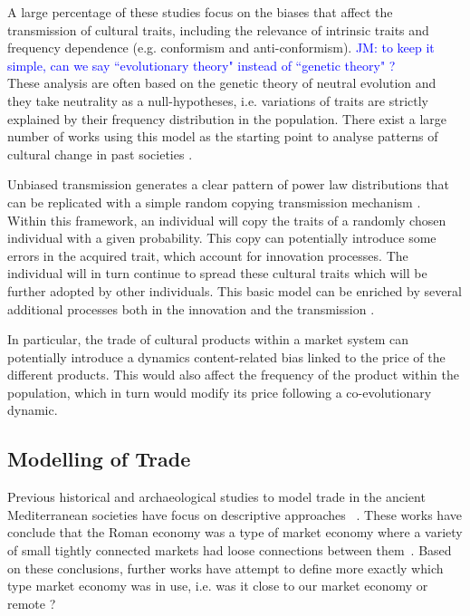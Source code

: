 \documentclass{wscpaperproc}
\newcommand{\memo}[2]{\textcolor{#1}{#2}}
\newcommand{\jm}[1]{\memo{blue}{JM: #1\\}}
\begin{document}
A large percentage of these studies focus on the biases that affect the transmission of cultural traits, including the relevance of intrinsic traits and frequency dependence (e.g. conformism and anti-conformism). 
\jm{to keep it simple, can we say ``evolutionary theory" instead of ``genetic theory" ?}
These analysis are often based on the genetic theory of neutral evolution \cite{neiman_stylistic_1995} and they take neutrality as a null-hypotheses, i.e. variations of traits are strictly explained by their frequency distribution in the population. There exist a large number of works using this model as the starting point to analyse patterns of cultural change in past societies \cite{lipo_neutralitystyle_2001,shennan_ceramic_2001,steele_ceramic_2010,kandler_nonequilibrium_2013,porcic_exploring_2014,crema_approximate_2014}.

Unbiased transmission generates a clear pattern of power law distributions that can be replicated with a simple random copying transmission mechanism \cite{bentley_random_2004}. Within this framework, an individual will copy the traits of a randomly chosen individual with a given probability. This copy can potentially introduce some errors in the acquired trait, which account for innovation processes. The individual will in turn continue to spread these cultural traits which will be further adopted by other individuals. This basic model can be enriched by several additional processes both in the innovation \cite{schillinger_copying_2014,sole_evolutionary_2013,ziman_technological_2003} and the transmission \cite{heyes_social_1994,henrich_evolution_2003}.

In particular, the trade of cultural products within a market system can potentially introduce a dynamics content-related bias linked to the price of the different products. This would also affect the frequency of the product within the population, which in turn would modify its price following a co-evolutionary dynamic.


\subsection{Modelling of Trade}


Previous historical and archaeological studies to model trade in the ancient Mediterranean societies have focus on descriptive approaches ~\cite{hopkins_taxes_1980,temin_market_2001,terpstra_trade_2011,temin_economy_2006,wilson_approaches_2009,scheidel_model_2007,kessler_organization_2007}. 
These works have conclude that the Roman economy was a type of market economy where a variety of small tightly connected markets had loose connections between them~\cite{temin_market_2001,temin_economy_2006,wilson_approaches_2009}. 
Based on these conclusions, further works have attempt to define more exactly which type market economy was in use, i.e. was it close to our market economy or remote ? 
\end{document}
